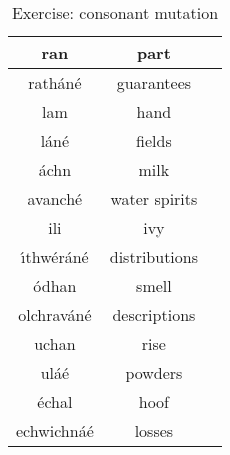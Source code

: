 \begin{table}[H]
{\begin{tabu}{|c|c|M{10.0cm}|}
  \midrule
  ran & part & \\
  \midrule
  rath\'{a}n\'{e} & guarantees & \\
  \midrule
  lam & hand & \\
  \midrule
  l\'{a}n\'{e} & fields & \\
  \midrule
  \'{a}chn & milk & \\
  \midrule
  avanch\'{e} & water spirits & \\
  \midrule
  ili & ivy & \\
  \midrule
  \'{\i}thw\'{e}r\'{a}n\'{e} & distributions & \\
  \midrule
  \'{o}dhan & smell & \\
  \midrule
  olchrav\'{a}n\'{e} & descriptions & \\
  \midrule
  uchan & rise & \\
  \midrule
  ul\'{a}\'{e} & powders & \\
  \midrule
  \'{e}chal & hoof & \\
  \midrule
  echwichn\'{a}\'{e} & losses & \\
  \bottomrule
\end{tabu}
}
\label{exercise_consonant_mutation}
\caption{Exercise: consonant mutation}
\end{table}

